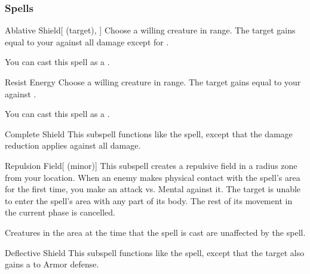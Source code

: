 \subsubsection{Spells}


\begin{ability}[\nth{1}]{Ablative Shield}[ (target), ]
Choose a willing creature in \rngclose range.
The target gains  equal to your  against all damage except for .

You can cast this spell as a .
\end{ability}
\vspace{0.25em}



\begin{ability}[\nth{1}]{Resist Energy}
Choose a willing creature in \rngclose range.
The target gains  equal to your  against .

You can cast this spell as a .
\end{ability}
\vspace{0.25em}



\begin{ability}[\nth{2}]{Complete Shield}
This subspell functions like the  spell, except that the damage reduction applies against all damage.
\end{ability}
\vspace{0.25em}



\begin{ability}[\nth{2}]{Repulsion Field}[ (minor)]
This subspell creates a repulsive field in a \areamed radius zone from your location.
When an enemy makes physical contact with the spell's area for the first time, you make an attack vs. Mental against it.
\hit The target is unable to enter the spell's area with any part of its body.
The rest of its movement in the current phase is cancelled.

Creatures in the area at the time that the spell is cast are unaffected by the spell.
\end{ability}
\vspace{0.25em}



\begin{ability}[\nth{3}]{Deflective Shield}
This subspell functions like the  spell, except that the target also gains a   to Armor defense.
\end{ability}
\vspace{0.25em}




